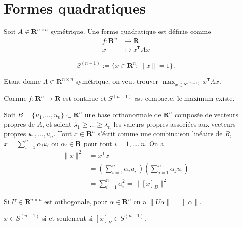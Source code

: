 \section{Formes quadratiques}
\begin{definition}
Soit $A\in \mathbf{R}^{n\times n}$ symétrique. Une forme quadratique est définie comme
\begin{align*}
f:\mathbf{R}^{n} & \to \mathbf{R} \\
x & \mapsto x^{\mathsf{T}}Ax
\end{align*}

\end{definition}
\begin{definition}[Sphère]
$$
S^{(n-1)}:= \{ x \in \mathbf{R}^{n}:\lVert x \rVert =1 \}.
$$
\end{definition}

Etant donne $A\in \mathbf{R}^{n\times n}$ symétrique, on veut trouver $\max _{x \in S^{(n-1)}}x^{\mathsf{T}}Ax$.
\begin{remark}
Comme $f:\mathbf{R}^{n}\to \mathbf{R}$ est continue et $S^{(n-1)}$ est compacte, le maximum existe. 
\end{remark}

Soit $B=\{ u_{1},\dots,u_{n} \}\subset \mathbf{R}^{n}$ une base orthonormale de $\mathbf{R}^{n}$ composée de vecteurs propres de $A$, et soient $\lambda_{1}\ge \dots\ge \lambda _{n}$ les valeurs propres associées aux vecteurs propres $u_{1},\dots,u_{n}$. Tout $x \in \mathbf{R}^{n}$ s'écrit comme une combinaison linéaire de $B$, $x=\sum _{i=1}^{n}\alpha _{i}u_{i}$ ou $\alpha _{i}\in \mathbf{R}$ pour tout $i=1,\dots,n$. On a
\begin{align*}
\lVert x \rVert ^{2} &  = x^{\mathsf{T}}x \\
 & =\left( \sum _{i=1}^{n}\alpha _{i}u_{i}^{\mathsf{T}}  \right)\left( \sum_{j=1}^{n} \alpha _{j}u_{j} \right) \\
 & =\sum_{i=1}^{n} \alpha _{i}^{2}=\lVert[x]_{B}\rVert^{2}
\end{align*}
\begin{remark}
Si $U\in \mathbf{R}^{n\times n}$ est orthogonale, pour $\alpha \in \mathbf{R}^{n}$ on a $\lVert U\alpha \rVert=\lVert \alpha \rVert$.
\end{remark}
\begin{remark}
$x \in S^{(n-1)}$ si et seulement si $[x]_{B}\in S^{(n-1)}$.
\end{remark}

